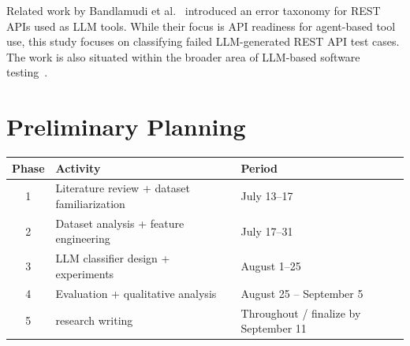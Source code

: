 \documentclass[12pt, a4paper]{article}
\begin{document}
Related work by Bandlamudi et al.~\cite{bandlamudi2025framework}
introduced an error taxonomy for REST APIs used as LLM tools. While
their focus is API readiness for agent-based tool use, this study
focuses on classifying failed LLM-generated REST API test cases.
The work is also situated within the broader area of LLM-based
software testing~\cite{wang2024softwaretesting}.

\section{Preliminary Planning}

\vspace{0.5em}
\begin{tabular}{@{} c p{7cm} p{5cm} @{}}
    \toprule
    \textbf{Phase} & \textbf{Activity} & \textbf{Period} \\
    \midrule
    1 & Literature review + dataset familiarization & July 13--17 \\[4pt]
    2 & Dataset analysis + feature engineering      & July 17--31 \\[4pt]
    3 & LLM classifier design + experiments         & August 1--25 \\[4pt]
    4 & Evaluation + qualitative analysis           & August 25 -- September 5 \\[4pt]
    5 & research writing                              & Throughout / finalize by September 11 \\
    \bottomrule
\end{tabular}
\end{document}
